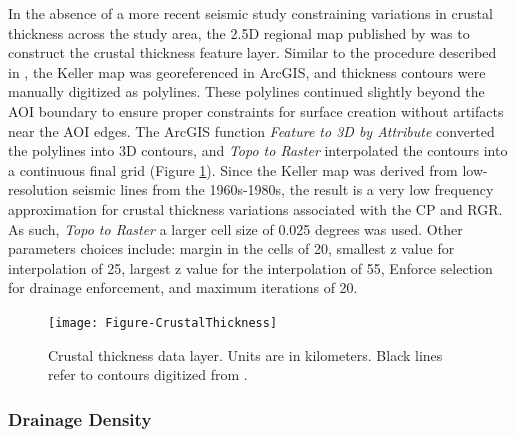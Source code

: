 In the absence of a more recent seismic study constraining variations in crustal thickness across the study area, the 2.5D regional map published by \citet{keller_comparative_1991} was to construct the crustal thickness feature layer. Similar to the procedure described in \citep{pepin_new_2018}, the Keller map was georeferenced in ArcGIS, and thickness contours were manually digitized as polylines. These polylines continued slightly beyond the AOI boundary to ensure proper constraints for surface creation without artifacts near the AOI edges. The ArcGIS function \textit{Feature to 3D by Attribute} converted the polylines into 3D contours, and \textit{Topo to Raster} interpolated the contours into a continuous final grid (Figure \ref{fig:feat_crust}). Since the Keller map was derived from low-resolution seismic lines from the 1960s-1980s, the result is a very low frequency approximation for crustal thickness variations associated with the CP and RGR. As such, \textit{Topo to Raster} a larger cell size of 0.025 degrees was used. Other parameters choices include: margin in the cells of 20, smallest z value for interpolation of 25, largest z value for the interpolation of 55, Enforce selection for drainage enforcement, and maximum iterations of 20.

\begin{figure}[!htp]
\centering
\texttt{[image: Figure-CrustalThickness]}
\caption[Crustal thickness data layer]{Crustal thickness data layer. Units are in kilometers. Black lines refer to contours digitized from \protect\citep{keller_comparative_1991}.}
\label{fig:feat_crust}
\end{figure}

\subsubsection{Drainage Density}

